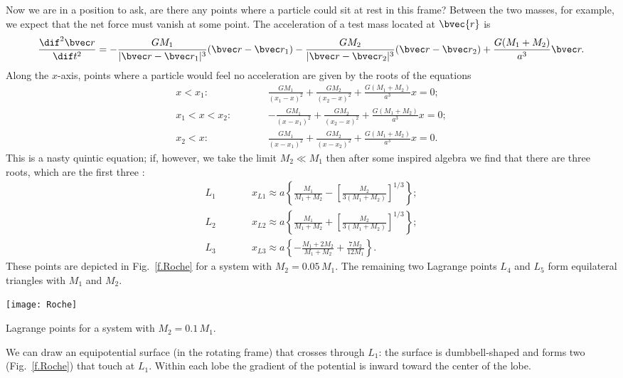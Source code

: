 Now we are in a position to ask, are there any points where a particle could sit at rest in this frame?
Between the two masses, for example, we expect that the net force must vanish at some point. The acceleration of a test mass located at $\bvec{r}$ is 
\begin{equation}\label{e.test-mass-acceleration-x}
\DDtt{\rv} = -\frac{GM_{1}}{|\rv-\rv_{1}|^{3}}(\rv-\rv_{1}) - \frac{GM_{2}}{|\rv-\rv_{2}|^{3}}(\rv-\rv_{2}) + \frac{G(M_{1}+M_{2})}{a^{3}} \rv.
\end{equation}
Along the $x$-axis, points where a particle would feel no acceleration are given by the roots of the equations
\begin{eqnarray*}
	x < x_{1}:&\qquad& \frac{GM_{1}}{(x_{1}-x)^{2}} + \frac{GM_{2}}{(x_{2}-x)^{2}} + \frac{G(M_{1}+M_{2})}{a^{3}} x = 0;\\
	x_{1} < x < x_{2}:&\qquad& -\frac{GM_{1}}{(x-x_{1})^{2}} + \frac{GM_{2}}{(x_{2}-x)^{2}} + \frac{G(M_{1}+M_{2})}{a^{3}} x = 0;\\
	x_{2} < x:&\qquad& \frac{GM_{1}}{(x-x_{1})^{2}} + \frac{GM_{2}}{(x-x_{2})^{2}} + \frac{G(M_{1}+M_{2})}{a^{3}} x = 0.
\end{eqnarray*}
This is a nasty quintic equation; if, however, we take the limit $M_{2}\ll M_{1}$ then after some inspired algebra we find that there are three roots, which are the first three :
\begin{eqnarray*}
L_{1} &\qquad& x_{L1} \approx a\left\{\frac{M_{1}}{M_{1}+M_{2}} - \left[\frac{M_{2}}{3(M_{1}+M_{2})}\right]^{1/3}\right\};\\
L_{2} &\qquad& x_{L2} \approx a\left\{\frac{M_{1}}{M_{1}+M_{2}} + \left[\frac{M_{2}}{3(M_{1}+M_{2})}\right]^{1/3}\right\};\\
L_{3} &\qquad& x_{L3} \approx a\left\{-\frac{M_{1}+2M_{2}}{M_{1}+M_{2}} + \frac{7M_{2}}{12M_{1}}\right\}.
\end{eqnarray*}
These points are depicted in Fig.~\ref{f.Roche} for a system with $M_{2} = 0.05\,M_{1}$.
The remaining two Lagrange points $L_{4}$ and $L_{5}$ form equilateral triangles with $M_{1}$ and $M_{2}$.
\begin{marginfigure}[-8\baselineskip]
\texttt{[image: Roche]}
\caption{Lagrange points for a system with $M_{2} = 0.1\,M_{1}$.
\label{f.Roche}}
\end{marginfigure}
We can draw an equipotential surface (in the rotating frame) that crosses through $L_{1}$: the surface is dumbbell-shaped and forms two  (Fig.~\ref{f.Roche}) that touch at $L_{1}$.  Within each lobe the gradient of the potential is inward toward the center of the lobe.

